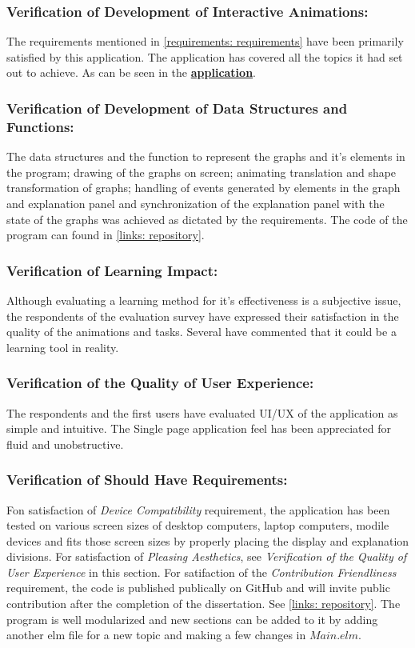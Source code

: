 \subsubsection{Verification of Development of Interactive Animations:}
The requirements mentioned in \autoref{requirements: requirements} have been
primarily satisfied by this application.  The application has covered all the
topics it had set out to achieve. As can be seen in the
\href{https://visualise-graph-problems-with-me.netlify.app/} {\textbf{application}}.



\subsubsection{Verification of Development of Data Structures and Functions:}
The data structures and the function to represent the graphs and it's elements
in the program; drawing of the graphs on screen; animating translation and
shape transformation of graphs; handling of events generated by elements in the
graph and explanation panel and synchronization of the explanation panel with
the state of the graphs was achieved as dictated by the requirements. The
code of the program can found in \autoref{links: repository}.
 

\subsubsection{Verification of Learning Impact:}
Although evaluating a learning method for it's effectiveness is a subjective
issue, the respondents of the evaluation survey have expressed their
satisfaction in the quality of the animations and tasks. Several have
commented that it could be a learning tool in reality.

\subsubsection{Verification of the Quality of User Experience:}
The respondents and the first users have evaluated UI/UX of the application as
simple and intuitive. The Single page application feel has been appreciated for
fluid and unobstructive. 

\subsubsection{Verification of Should Have Requirements:}
Fon satisfaction of \emph{Device Compatibility} requirement, the application has been
tested on various screen sizes of desktop computers, laptop computers, modile
devices and fits those screen sizes by properly placing the display and
explanation divisions.
For satisfaction of \emph{Pleasing Aesthetics}, see \emph{Verification of the Quality of
User Experience} in this section.
For satifaction of the \emph{Contribution Friendliness} requirement, the code
is published publically on GitHub and will invite public contribution
after the completion of the dissertation. See \autoref{links: repository}.  The
program is well modularized and new sections can be added to it by adding
another elm file for a new topic and making a few changes in $Main.elm$.

